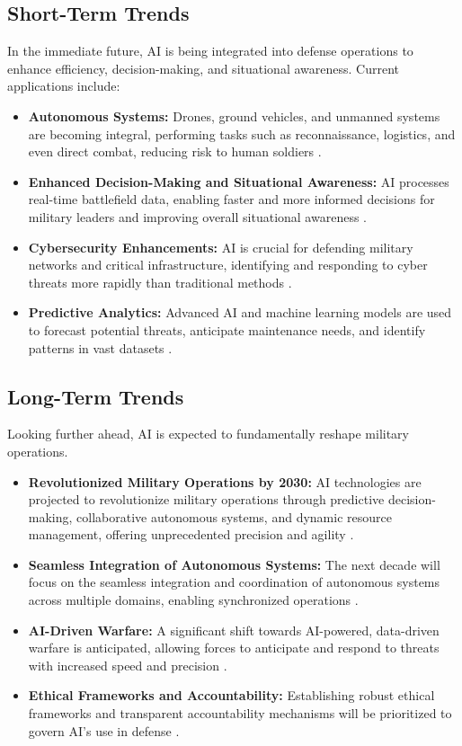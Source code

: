 \subsection{Short-Term Trends}
In the immediate future, AI is being integrated into defense operations to enhance efficiency, decision-making, and situational awareness. Current applications include:
\begin{itemize}
    \item \textbf{Autonomous Systems:} Drones, ground vehicles, and unmanned systems are becoming integral, performing tasks such as reconnaissance, logistics, and even direct combat, reducing risk to human soldiers \cite{TechAheadCorp_FutureTrends, TimesTech_FutureTrends}.
    \item \textbf{Enhanced Decision-Making and Situational Awareness:} AI processes real-time battlefield data, enabling faster and more informed decisions for military leaders and improving overall situational awareness \cite{NationalDefenseMagazine_FutureTrends, PwC_FutureTrends}.
    \item \textbf{Cybersecurity Enhancements:} AI is crucial for defending military networks and critical infrastructure, identifying and responding to cyber threats more rapidly than traditional methods \cite{NationalDefenseMagazine_FutureTrends}.
    \item \textbf{Predictive Analytics:} Advanced AI and machine learning models are used to forecast potential threats, anticipate maintenance needs, and identify patterns in vast datasets \cite{EuroDev_FutureTrends}.
\end{itemize}

\subsection{Long-Term Trends}
Looking further ahead, AI is expected to fundamentally reshape military operations.
\begin{itemize}
    \item \textbf{Revolutionized Military Operations by 2030:} AI technologies are projected to revolutionize military operations through predictive decision-making, collaborative autonomous systems, and dynamic resource management, offering unprecedented precision and agility \cite{ElbitSystems_FutureTrends}.
    \item \textbf{Seamless Integration of Autonomous Systems:} The next decade will focus on the seamless integration and coordination of autonomous systems across multiple domains, enabling synchronized operations \cite{ThalesGroup_FutureTrends}.
    \item \textbf{AI-Driven Warfare:} A significant shift towards AI-powered, data-driven warfare is anticipated, allowing forces to anticipate and respond to threats with increased speed and precision \cite{RUSI_FutureTrends}.
    \item \textbf{Ethical Frameworks and Accountability:} Establishing robust ethical frameworks and transparent accountability mechanisms will be prioritized to govern AI's use in defense \cite{FOI_FutureTrends}.
\end{itemize}

